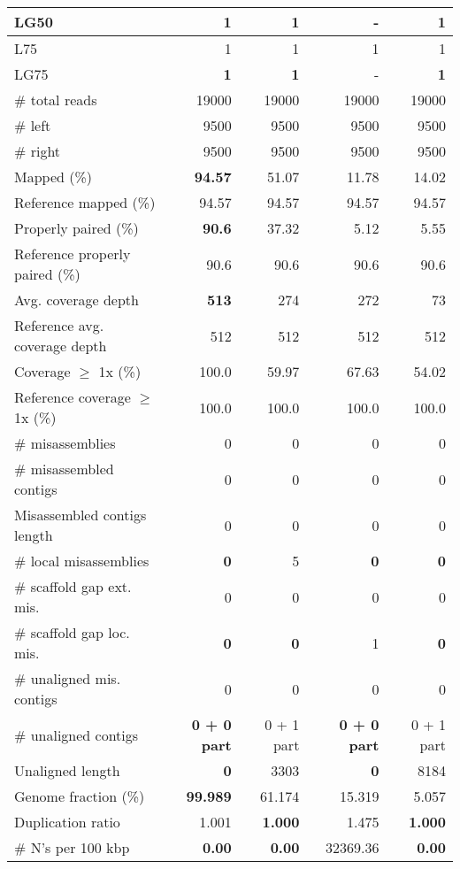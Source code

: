 \documentclass[12pt,a4paper]{article}
\begin{document}
\begin{table}[ht]
\begin{center}
\begin{tabular}{|l*{4}{|r}|}
LG50 & {\bf 1} & {\bf 1} & - & {\bf 1} \\ \hline
L75 & 1 & 1 & 1 & 1 \\ \hline
LG75 & {\bf 1} & {\bf 1} & - & {\bf 1} \\ \hline
\# total reads & 19000 & 19000 & 19000 & 19000 \\ \hline
\# left & 9500 & 9500 & 9500 & 9500 \\ \hline
\# right & 9500 & 9500 & 9500 & 9500 \\ \hline
Mapped (\%) & {\bf 94.57} & 51.07 & 11.78 & 14.02 \\ \hline
Reference mapped (\%) & 94.57 & 94.57 & 94.57 & 94.57 \\ \hline
Properly paired (\%) & {\bf 90.6} & 37.32 & 5.12 & 5.55 \\ \hline
Reference properly paired (\%) & 90.6 & 90.6 & 90.6 & 90.6 \\ \hline
Avg. coverage depth & {\bf 513} & 274 & 272 & 73 \\ \hline
Reference avg. coverage depth & 512 & 512 & 512 & 512 \\ \hline
Coverage $\geq$ 1x (\%) & 100.0 & 59.97 & 67.63 & 54.02 \\ \hline
Reference coverage $\geq$ 1x (\%) & 100.0 & 100.0 & 100.0 & 100.0 \\ \hline
\# misassemblies & 0 & 0 & 0 & 0 \\ \hline
\# misassembled contigs & 0 & 0 & 0 & 0 \\ \hline
Misassembled contigs length & 0 & 0 & 0 & 0 \\ \hline
\# local misassemblies & {\bf 0} & 5 & {\bf 0} & {\bf 0} \\ \hline
\# scaffold gap ext. mis. & 0 & 0 & 0 & 0 \\ \hline
\# scaffold gap loc. mis. & {\bf 0} & {\bf 0} & 1 & {\bf 0} \\ \hline
\# unaligned mis. contigs & 0 & 0 & 0 & 0 \\ \hline
\# unaligned contigs & {\bf 0 + 0 part} & 0 + 1 part & {\bf 0 + 0 part} & 0 + 1 part \\ \hline
Unaligned length & {\bf 0} & 3303 & {\bf 0} & 8184 \\ \hline
Genome fraction (\%) & {\bf 99.989} & 61.174 & 15.319 & 5.057 \\ \hline
Duplication ratio & 1.001 & {\bf 1.000} & 1.475 & {\bf 1.000} \\ \hline
\# N's per 100 kbp & {\bf 0.00} & {\bf 0.00} & 32369.36 & {\bf 0.00} \\ \hline

\end{tabular}
\end{center}
\end{table}
\end{document}
